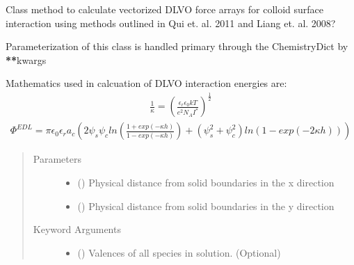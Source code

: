 \documentclass[letterpaper,10pt,english]{sphinxmanual}
\begin{document}
\begin{fulllineitems}
\label{\detokenize{index:lb_colloids.Colloids.Colloid_Math.DLVO}}
Class method to calculate vectorized DLVO force arrays for colloid surface interaction using
methods outlined in Qui et. al. 2011 and Liang et. al. 2008? 

Parameterization of this class is handled primary through the ChemistryDict by {\color{red}\bfseries{}**}kwargs

Mathematics used in calcuation of DLVO interaction energies are:
\begin{equation*}
\begin{split}\frac{1}{\kappa} = (\frac{\epsilon_{r} \epsilon_{0} k T}{e^{2} N_{A} I^{*}})^{\frac{1}{2}}\end{split}
\end{equation*}\begin{equation*}
\begin{split}\Phi^{EDL} = \pi \epsilon_{0} \epsilon_{r} a_{c}
(2 \psi_{s} \psi_{c}
ln(\frac{1 + exp(-\kappa h)}{1 - exp(-\kappa h)})
+ (\psi_{s}^{2} + \psi_{c}^{2})
ln(1 - exp(-2 \kappa h)))\end{split}
\end{equation*}\begin{quote}\begin{description}
\item[{Parameters}] \leavevmode\begin{itemize}
\item {} 
 () \textendash{} Physical distance from solid boundaries in the x direction

\item {} 
 () \textendash{} Physical distance from solid boundaries in the y direction

\end{itemize}

\item[{Keyword Arguments}] \leavevmode\begin{itemize}
\item {} 
 () \textendash{} Valences of all species in solution. (Optional)


\end{itemize}
\end{description}
\end{quote}
\end{fulllineitems}
\end{document}
